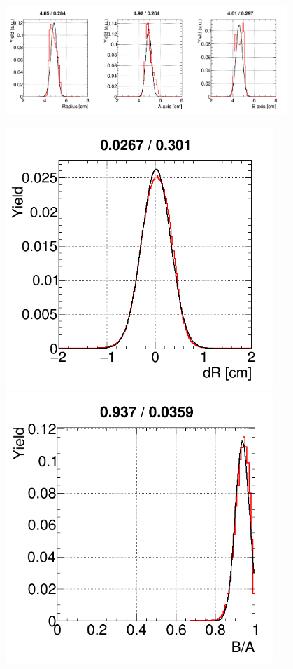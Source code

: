 \begin{figure}[H]
\includegraphics[width=0.95\textwidth]{pictures/RICH_R_A_B.png}
\caption{}
\label{fig:RICHchar2}
\end{figure}

\begin{figure}[H]
\begin{minipage}[t]{0.495\textwidth}
\includegraphics[width=0.9\textwidth]{pictures/RICH_dR.png}
\end{minipage}
\begin{minipage}[t]{0.495\textwidth}
\includegraphics[width=0.9\textwidth]{pictures/RICH_BoverA.png}

\end{minipage}
\end{figure}
